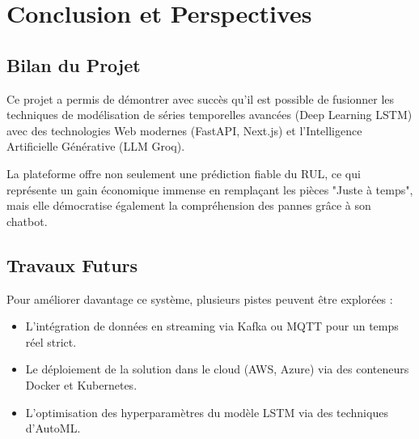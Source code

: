 \documentclass[12pt,a4paper]{report}
\begin{document}
\chapter{Conclusion et Perspectives}

\section{Bilan du Projet}
Ce projet a permis de démontrer avec succès qu'il est possible de fusionner les techniques de modélisation de séries temporelles avancées (Deep Learning LSTM) avec des technologies Web modernes (FastAPI, Next.js) et l'Intelligence Artificielle Générative (LLM Groq). 

La plateforme offre non seulement une prédiction fiable du RUL, ce qui représente un gain économique immense en remplaçant les pièces "Juste à temps", mais elle démocratise également la compréhension des pannes grâce à son chatbot.

\section{Travaux Futurs}
Pour améliorer davantage ce système, plusieurs pistes peuvent être explorées :
\begin{itemize}
    \item L'intégration de données en streaming via Kafka ou MQTT pour un temps réel strict.
    \item Le déploiement de la solution dans le cloud (AWS, Azure) via des conteneurs Docker et Kubernetes.
    \item L'optimisation des hyperparamètres du modèle LSTM via des techniques d'AutoML.
\end{itemize}

\end{document}
